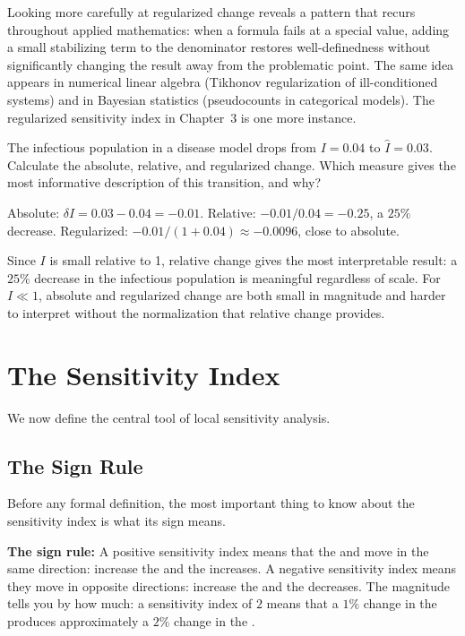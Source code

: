 Looking more carefully at regularized change reveals a pattern that
recurs throughout applied mathematics: when a formula fails at a
special value, adding a small stabilizing term to the denominator
restores well-definedness without significantly changing the result
away from the problematic point. The same idea appears in numerical
linear algebra (Tikhonov regularization of ill-conditioned systems)
and in Bayesian statistics (pseudocounts in categorical models).
The regularized sensitivity index in Chapter~3 is one more instance.

\begin{selfcheck}
The infectious population in a disease model drops from $I = 0.04$
to $\hat{I} = 0.03$. Calculate the absolute, relative, and
regularized change. Which measure gives the most informative
description of this transition, and why?
\end{selfcheck}
\begin{scAnswer}
Absolute: $\delta I = 0.03 - 0.04 = -0.01$.
Relative: $-0.01/0.04 = -0.25$, a $25\%$ decrease.
Regularized: $-0.01/(1 + 0.04) \approx -0.0096$, close to absolute.

Since $I$ is small relative to 1, relative change gives the most
interpretable result: a $25\%$ decrease in the infectious population
is meaningful regardless of scale. For $I \ll 1$, absolute and
regularized change are both small in magnitude and harder to interpret
without the normalization that relative change provides.
\end{scAnswer}

\section{The Sensitivity Index}
\label{sec:sensitivityindex}

We now define the central tool of local sensitivity analysis.

\subsection{The Sign Rule}

Before any formal definition, the most important thing to know
about the sensitivity index is what its sign means.

\medskip
\noindent
\textbf{The sign rule:} A positive sensitivity index means that
the \QOI and \POI move in the same direction: increase the \POI
and the \QOI increases. A negative sensitivity index means they
move in opposite directions: increase the \POI and the \QOI
decreases. The magnitude tells you by how much: a sensitivity index
of $2$ means that a $1\%$ change in the \POI produces
approximately a $2\%$ change in the \QOI.


